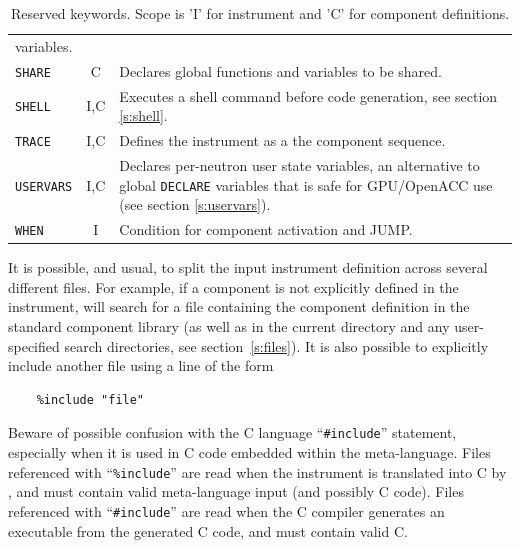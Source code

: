\begin{table}
\begin{center}
{\begin{tabular}{|l|c|p{}|}
      variables. \\
      \texttt{SHARE} & C & Declares global functions and variables to be shared. \\
      \texttt{SHELL} & I,C & Executes a shell command before code generation, see section \ref{s:shell}. \\
      \texttt{TRACE} & I,C & Defines the instrument as a the component sequence. \\
      \texttt{USERVARS} & I,C & Declares per-neutron user state variables, an alternative to global \texttt{DECLARE} variables that is safe for GPU/OpenACC use (see section \ref{s:uservars}). \\
      \texttt{WHEN}  & I & Condition for component activation and JUMP.\\
      \hline
    \end{tabular}
    \caption{Reserved \MCS keywords.
    Scope is 'I' for instrument and 'C' for component definitions.
    }
    \label{t:keywords}
    }
  \end{center}
\end{table}

It is possible, and usual, to split the input instrument definition
across several different files. For example, if a component is not
explicitly defined in the instrument,
\mcs will search for a file containing the component definition in the
standard component library (as well as in the current directory and any
user-specified search directories, see section~\ref{s:files}). It is
also possible to explicitly include another file using a line of the
form 
\begin{lstlisting}
    %include "file"
\end{lstlisting}
Beware of possible confusion with the C language ``\verb+#include+''
statement, especially when it is used in C code embedded within the
\MCS meta-language. Files referenced with ``\verb+%include+'' are read
when the instrument is translated into C by \mcs, and must
contain valid \MCS meta-language input (and possibly C code). Files referenced with
``\verb+#include+'' are read when the C compiler generates an
executable from the generated C code, and must contain valid C.

